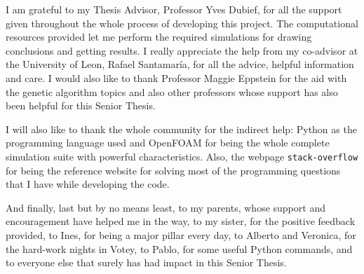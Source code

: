 \begin{acknowledgements}

I am grateful to my Thesis Advisor, Professor Yves Dubief, for all the support given throughout the whole process of developing this project. The computational resources provided let me perform the required simulations for drawing conclusions and getting results. I really appreciate the help from my co-advisor at the University of Leon, Rafael Santamaría, for all the advice, helpful information and care. I would also like to thank Professor Maggie Eppstein for the aid with the genetic algorithm topics and also other professors whose support has also been helpful for this Senior Thesis.

I will also like to thank the whole community for the indirect help: Python as the programming language used and OpenFOAM for being the whole complete simulation suite with powerful characteristics. Also, the webpage \texttt{stack-overflow} for being the reference website for solving most of the programming questions that I have while developing the code. 

And finally, last but by no means least, to my parents, whose support and encouragement have helped me in the way, to my sister, for the positive feedback provided, to Ines, for being a major pillar every day, to Alberto and Veronica, for the hard-work nights in Votey, to Pablo, for some useful Python commands, and to everyone else that surely has had impact in this Senior Thesis.

\end{acknowledgements}